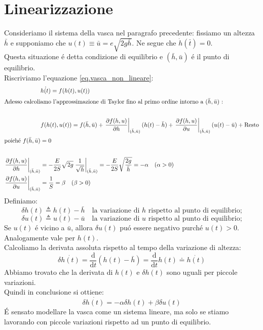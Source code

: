 \documentclass[../main.tex]{subfiles}
\begin{document}
	\section{Linearizzazione}
		Consideriamo il sistema della vasca nel paragrafo precedente: fissiamo un altezza $ \bar{h} $ e supponiamo che $u(t) \equiv \bar{u} = e \sqrt{2g \bar{h}}$. Ne segue che $ \dot{h}(\bar{t}) =0 $.\\
		Questa situazione \'e detta condizione di equilibrio e $( \bar{h} , \bar{u}) $ \'e il punto di equilibrio.\\
		Riscriviamo l'equazione \ref{eq.vasca_non_lineare}:
		\begin{align*}	
				&\dot{h(t)} = f(h(t),u(t))\\		
				\intertext{Adesso calcoliamo l'approssimazione di Taylor fino al primo ordine intorno a $ (\bar{h},\bar{u}) $ :} \\
				&f(h(t),u(t)) = f(\bar{h},\bar{u}) + \left. \frac{\partial f(h,u)}{\partial h} \right|_{(\bar{h},\bar{u})} (h(t) - \bar{h}) + \left. \frac{\partial f(h,u)}{\partial u} \right|_{(\bar{h},\bar{u})} (u(t) - \bar{u}) + \mbox{Resto}\\
				\intertext{poich\'e $ f(\bar{h},\bar{u}) =0$}\\
				\left. \frac{\partial f(h,u)}{\partial h} \right|_{(\bar{h},\bar{u})} &= - \frac{E}{2S} \sqrt{2g} \left. \frac{1}{\sqrt{h}} \right|_{(\bar{h},\bar{u})} = - \frac{E}{2S} \sqrt{\frac{2g}{\bar{h}}} = - \alpha \quad (\alpha > 0)\\
				\left. \frac{\partial f(h,u)}{\partial u} \right|_{(\bar{h},\bar{u})} &= \frac{1}{S} = \beta \quad (\beta > 0)  
		\end{align*}
		Definiamo:
		\[ \delta h(t) \triangleq h(t)- \bar{h} \quad \text{la variazione di $h$ rispetto al punto di equilibrio;} \]
		\[ \delta u(t) \triangleq u(t)- \bar{u} \quad \text{la variazione di $u$ rispetto al punto di equilibrio;} \]
		Se $u(t)$ \'e vicino a $\bar{u}$, allora $\delta u(t)$ pu\'o essere negativo purch\'e $u(t)>0$. Analogamente vale per $h(t)$.\\
		Calcoliamo la derivata assoluta rispetto al tempo della variazione di altezza:
		\[ \delta \dot{h(t)} = \frac{\mathrm{d}}{\mathrm{d} t}(h(t)-\bar{h}) = \frac{\mathrm{d}}{\mathrm{d} t}h(t) \doteq \dot{h(t)} \] 
		Abbiamo trovato che la derivata di $h(t)$ e $\delta h(t)$ sono uguali per piccole variazioni.\\
		Quindi in conclusione si ottiene:
		\begin{equation}
			\delta \dot{h(t)} = -\alpha \delta h(t) + \beta \delta u(t)
		\end{equation}
		\'E sensato modellare la vasca come un sistema lineare, ma solo se stiamo lavorando con piccole variazioni rispetto ad un punto di equilibrio.
\end{document}
